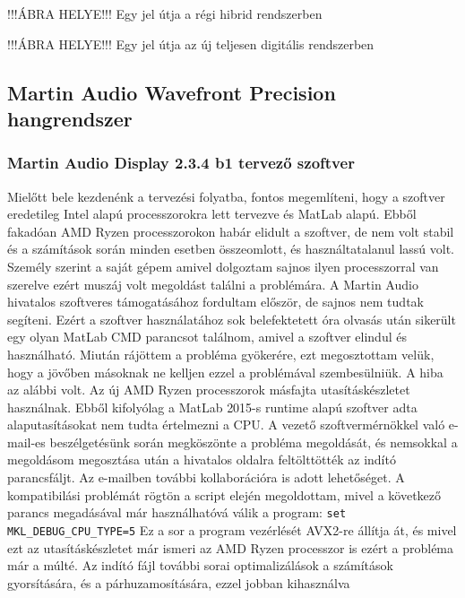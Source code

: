 !!!ÁBRA HELYE!!! Egy jel útja a régi hibrid rendszerben

!!!ÁBRA HELYE!!! Egy jel útja az új teljesen digitális rendszerben

\subsection{Martin Audio Wavefront Precision hangrendszer}
\subsubsection{Martin Audio Display 2.3.4 b1 tervező szoftver \cite{DISPLAY23USERGUIDE}}
Mielőtt bele kezdenénk a tervezési folyatba, fontos megemlíteni, hogy a szoftver
eredetileg Intel alapú processzorokra lett tervezve és MatLab alapú. Ebből fakadóan
AMD Ryzen processzorokon habár elidult a szoftver, de nem volt stabil és a számítások során
minden esetben összeomlott, és használtatalanul lassú volt. Személy szerint a saját gépem amivel dolgoztam
sajnos ilyen processzorral van szerelve ezért muszáj volt megoldást találni a problémára.
A Martin Audio hivatalos szoftveres támogatásához fordultam először, de sajnos nem tudtak segíteni.
Ezért a szoftver használatához
sok belefektetett óra olvasás után sikerült egy olyan MatLab CMD parancsot találnom, amivel
a szoftver elindul és használható.
Miután rájöttem a probléma gyökerére, ezt megosztottam velük, hogy a jövőben másoknak ne kelljen
ezzel a problémával szembesülniük.
A hiba az alábbi volt. Az új AMD Ryzen processzorok másfajta utasításkészletet használnak.
Ebből kifolyólag a MatLab 2015-s runtime alapú szoftver adta alaputasításokat nem tudta értelmezni a CPU.
A vezető szoftvermérnökkel való e-mail-es beszélgetésünk során megköszönte a probléma
megoldását, és nemsokkal a megoldásom megosztása után a hivatalos oldalra feltölttötték
az indító parancsfáljt. Az e-mailben további kollaborációra is adott lehetőséget.
A kompatibilási problémát rögtön a script elején megoldottam,
mivel a következő parancs megadásával már használhatóvá válik a program: \texttt{set MKL\_DEBUG\_CPU\_TYPE=5} \newline
Ez a sor a program vezérlését AVX2-re állítja át, és mivel ezt az utasításkészletet már ismeri az AMD Ryzen processzor
is ezért a probléma már a múlté.
Az indító fájl további sorai optimalizálások a számítások gyorsítására, és a párhuzamosítására, ezzel jobban kihasználva

